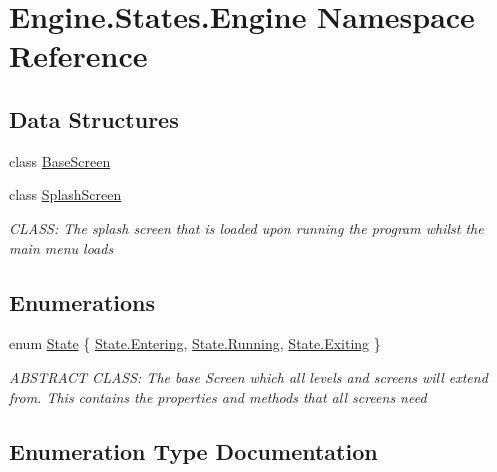 \hypertarget{a00276}{}\section{Engine.\+States.\+Engine Namespace Reference}
\label{a00276}
\subsection*{Data Structures}
\begin{DoxyCompactItemize}
\item 
class \hyperlink{a00550}{Base\+Screen}
\item 
class \hyperlink{a00554}{Splash\+Screen}
\begin{DoxyCompactList}\small\item\em C\+L\+A\+SS\+: The splash screen that is loaded upon running the program whilst the main menu loads \end{DoxyCompactList}\end{DoxyCompactItemize}
\subsection*{Enumerations}
\begin{DoxyCompactItemize}
\item 
enum \hyperlink{a00276_a523ba47df707c4a9f45f2d7c7c6bf8ab}{State} \{ \hyperlink{a00276_a523ba47df707c4a9f45f2d7c7c6bf8aba8509939e44cc05f7a4da43eaa87e45c4}{State.\+Entering}, 
\hyperlink{a00276_a523ba47df707c4a9f45f2d7c7c6bf8aba5bda814c4aedb126839228f1a3d92f09}{State.\+Running}, 
\hyperlink{a00276_a523ba47df707c4a9f45f2d7c7c6bf8aba0657d962b72e6f1f37dda8dad3684cb8}{State.\+Exiting}
 \}\begin{DoxyCompactList}\small\item\em A\+B\+S\+T\+R\+A\+CT C\+L\+A\+SS\+: The base Screen which all levels and screens will extend from. This contains the properties and methods that all screens need \end{DoxyCompactList}
\end{DoxyCompactItemize}


\subsection{Enumeration Type Documentation}
\mbox{\label{a00276_a523ba47df707c4a9f45f2d7c7c6bf8ab}} 
